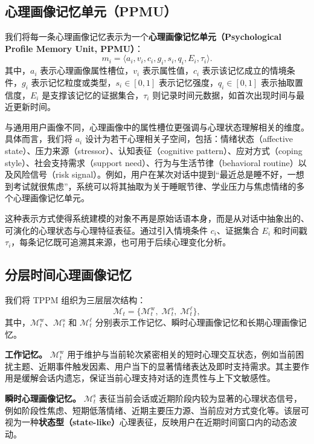\documentclass[12pt,a4paper]{article}
\newcommand{\methodname}{\textsc{TPPM}}
\begin{document}
\subsection{心理画像记忆单元（PPMU）}

我们将每一条心理画像记忆表示为一个\textbf{心理画像记忆单元（Psychological Profile Memory Unit, PPMU）}：
\begin{equation}
m_i = \langle a_i, v_i, c_i, g_i, s_i, q_i, E_i, \tau_i \rangle.
\label{eq:ppmu}
\end{equation}
其中，$a_i$ 表示心理画像属性槽位，$v_i$ 表示属性值，$c_i$ 表示该记忆成立的情境条件，$g_i$ 表示记忆粒度或类型，$s_i \in [0, 1]$ 表示记忆强度，$q_i \in [0, 1]$ 表示抽取置信度，$E_i$ 是支撑该记忆的证据集合，$\tau_i$ 则记录时间元数据，如首次出现时间与最近更新时间。

与通用用户画像不同，心理画像中的属性槽位更强调与心理状态理解相关的维度。具体而言，我们将 $a_i$ 设计为若干心理相关子空间，包括：情绪状态（affective state）、压力来源（stressor）、认知表征（cognitive pattern）、应对方式（coping style）、社会支持需求（support need）、行为与生活节律（behavioral routine）以及风险信号（risk signal）。例如，用户在某次对话中提到``最近总是睡不好，一想到考试就很焦虑''，系统可以将其抽取为关于睡眠节律、学业压力与焦虑情绪的多个心理画像记忆单元。

这种表示方式使得系统建模的对象不再是原始话语本身，而是从对话中抽象出的、可演化的心理状态与心理特征表征。通过引入情境条件 $c_i$、证据集合 $E_i$ 和时间戳 $\tau_i$，每条记忆既可追溯其来源，也可用于后续心理变化分析。

\subsection{分层时间心理画像记忆}

我们将 \methodname{} 组织为三层层次结构：
\begin{equation}
\mathcal{M}_t = \{\mathcal{M}^{\text{w}}_t,\; \mathcal{M}^{\text{s}}_t,\; \mathcal{M}^{\ell}_t\},
\label{eq:layers}
\end{equation}
其中，$\mathcal{M}^{\text{w}}_t$、$\mathcal{M}^{\text{s}}_t$ 和 $\mathcal{M}^{\ell}_t$ 分别表示工作记忆、瞬时心理画像记忆和长期心理画像记忆。

\textbf{工作记忆。} $\mathcal{M}^{\text{w}}_t$ 用于维护与当前轮次紧密相关的短时心理交互状态，例如当前困扰主题、近期事件触发因素、用户当下的显著情绪表达及即时支持需求。其主要作用是缓解会话内遗忘，保证当前心理支持对话的连贯性与上下文敏感性。

\textbf{瞬时心理画像记忆。} $\mathcal{M}^{\text{s}}_t$ 表征当前会话或近期阶段内较为显著的心理状态信号，例如阶段性焦虑、短期低落情绪、近期主要压力源、当前应对方式变化等。该层可视为一种\textbf{状态型（state-like）}心理表征，反映用户在近期时间窗口内的动态波动。
\end{document}
